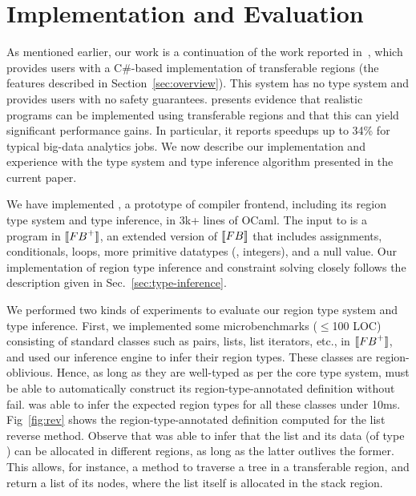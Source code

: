 \section{Implementation and Evaluation}
\label{sec:implementation}


As mentioned earlier, our work is a continuation of the work reported
in~\cite{Broom:HotOS}, which provides users with a C\#-based
implementation of transferable regions (the features described in
Section~\ref{sec:overview}). This system has no type system and
provides users with no safety guarantees. \cite{Broom:HotOS} presents
evidence that realistic programs can be implemented using transferable
regions and that this can yield significant performance gains.  In
particular, it reports speedups up to 34\% for typical big-data
analytics jobs.  We now describe our implementation and experience
with the type system and type inference algorithm presented in the
current paper.

We have implemented \namec, a prototype of \name compiler frontend,
including its region type system and type inference, in 3k+ lines of
OCaml.
The input to \namec is a program in $\llbracket {\sc FB}^+ \rrbracket$, an extended
version of $\llbracket {\sc FB} \rrbracket$ that includes assignments, conditionals,
loops, more primitive datatypes (\eg, integers), and a null value. 
Our implementation of region type inference and constraint solving
closely follows the description given in
Sec.~\ref{sec:type-inference}.


We performed two kinds of experiments to evaluate our region type
system and type inference.  First, we implemented some microbenchmarks
($\le$100 LOC) consisting of standard classes such as pairs, lists,
list iterators, etc., in $\llbracket {\sc FB}^+ \rrbracket$, and used our inference
engine to infer their region types.  These classes are
region-oblivious. Hence, as long as they are well-typed as per the
core type system, \namec must be able to automatically construct its
region-type-annotated definition without fail. \namec was able to
infer the expected region types for all these classes under 10ms.
Fig~\ref{fig:rev} shows the region-type-annotated definition computed
for the list reverse method. Observe that \namec was able to infer
that the list and its data (of type ) can be allocated in
different regions, as long as the latter outlives the former. This
allows, for instance, a  method to traverse a tree in a
transferable region, and return a list of its nodes, where the list
itself is allocated in the stack region. 

